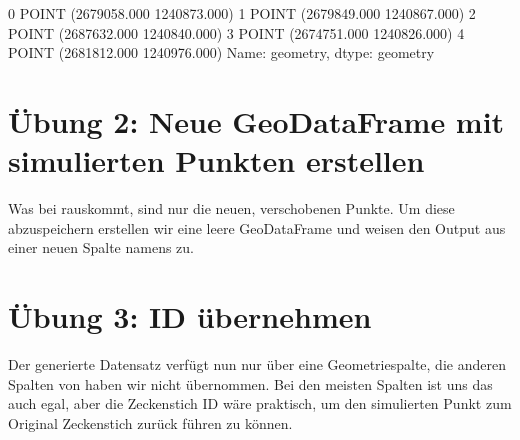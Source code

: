 \documentclass[letterpaper,10pt,english]{sphinxmanual}
\begin{document}
\begin{sphinxVerbatim}[commandchars=\\\{\}]
\PYG{p}{[}\PYG{p}{]} 
\end{sphinxVerbatim}

\begin{sphinxVerbatim}[commandchars=\\\{\}]
0    POINT (2679058.000 1240873.000)
1    POINT (2679849.000 1240867.000)
2    POINT (2687632.000 1240840.000)
3    POINT (2674751.000 1240826.000)
4    POINT (2681812.000 1240976.000)
Name: geometry, dtype: geometry
\end{sphinxVerbatim}


\section{Übung 2: Neue GeoDataFrame mit simulierten Punkten erstellen}
\label{\detokenize{02_05_Punkte_einer_GeoDataFrame_verschieben:ubung-2-neue-geodataframe-mit-simulierten-punkten-erstellen}}
Was bei  rauskommt, sind nur die neuen, verschobenen Punkte. Um diese abzuspeichern erstellen wir eine leere GeoDataFrame und weisen den Output aus  einer neuen Spalte namens  zu.

\begin{sphinxVerbatim}[commandchars=\\\{\}]
  
\PYG{p}{[}\PYG{p}{]}  \PYG{p}{[}\PYG{p}{]}
\end{sphinxVerbatim}


\section{Übung 3: ID übernehmen}
\label{\detokenize{02_05_Punkte_einer_GeoDataFrame_verschieben:ubung-3-id-ubernehmen}}
Der generierte Datensatz  verfügt nun nur über eine Geometriespalte, die anderen Spalten von  haben wir nicht übernommen. Bei den meisten Spalten ist uns das auch egal, aber die Zeckenstich ID wäre praktisch, um den simulierten Punkt zum Original Zeckenstich zurück führen zu können.
\end{document}
